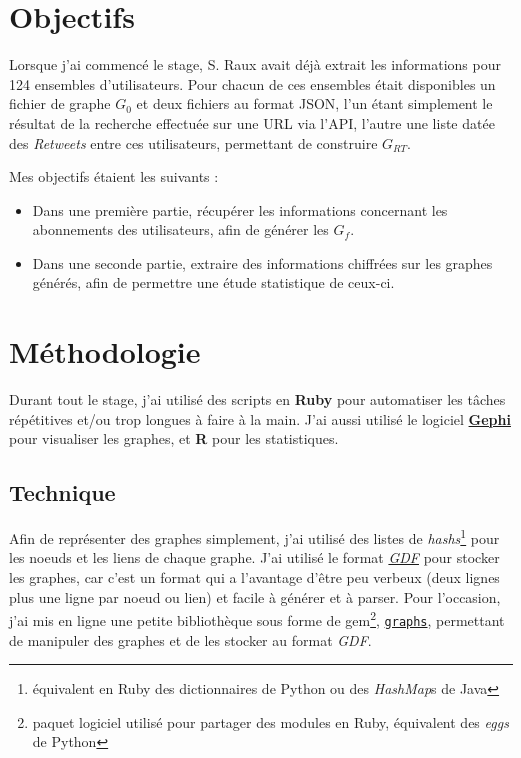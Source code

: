\documentclass[]{article}
\begin{document}
\section{Objectifs}

Lorsque j'ai commencé le stage, S. Raux avait déjà extrait les
informations pour 124 ensembles d'utilisateurs. Pour chacun de ces
ensembles était disponibles un fichier de graphe $G_{0}$ et deux fichiers
au format JSON, l'un étant simplement le résultat de la recherche
effectuée sur une URL via l'API, l'autre une liste datée des
\emph{Retweets} entre ces utilisateurs, permettant de construire $G_{RT}$.

Mes objectifs étaient les suivants :

\begin{itemize}
\item
 Dans une première partie, récupérer les informations concernant les
 abonnements des utilisateurs, afin de générer les $G_{f}$.
\item
 Dans une seconde partie, extraire des informations chiffrées sur les
 graphes générés, afin de permettre une étude statistique de ceux-ci.
\end{itemize}
\section{Méthodologie}

Durant tout le stage, j'ai utilisé des scripts en \textbf{Ruby} pour
automatiser les tâches répétitives et/ou trop longues à faire à la main.
J'ai aussi utilisé le logiciel \href{https://gephi.org}{\textbf{Gephi}}
pour visualiser les graphes, et \textbf{R} pour les statistiques.

\subsection{Technique}

Afin de représenter des graphes simplement, j'ai utilisé des listes de
\emph{hashs}\footnote{équivalent en Ruby des dictionnaires de Python ou
 des \emph{HashMap}s de Java} pour les noeuds et les liens de chaque
graphe. J'ai utilisé le format
\href{http://guess.wikispot.org/The\_GUESS\_.gdf\_format}{\emph{GDF}}
pour stocker les graphes, car c'est un format qui a l'avantage d'être
peu verbeux (deux lignes plus une ligne par noeud ou lien) et facile à 
générer et à parser. Pour l'occasion, j'ai mis en ligne une petite
bibliothèque sous forme de gem\footnote{paquet logiciel utilisé pour
 partager des modules en Ruby, équivalent des \emph{eggs} de Python},
\href{https://rubygems.org/gems/graphs}{\texttt{graphs}}, permettant de
manipuler des graphes et de les stocker au format \emph{GDF}.
\end{document}
